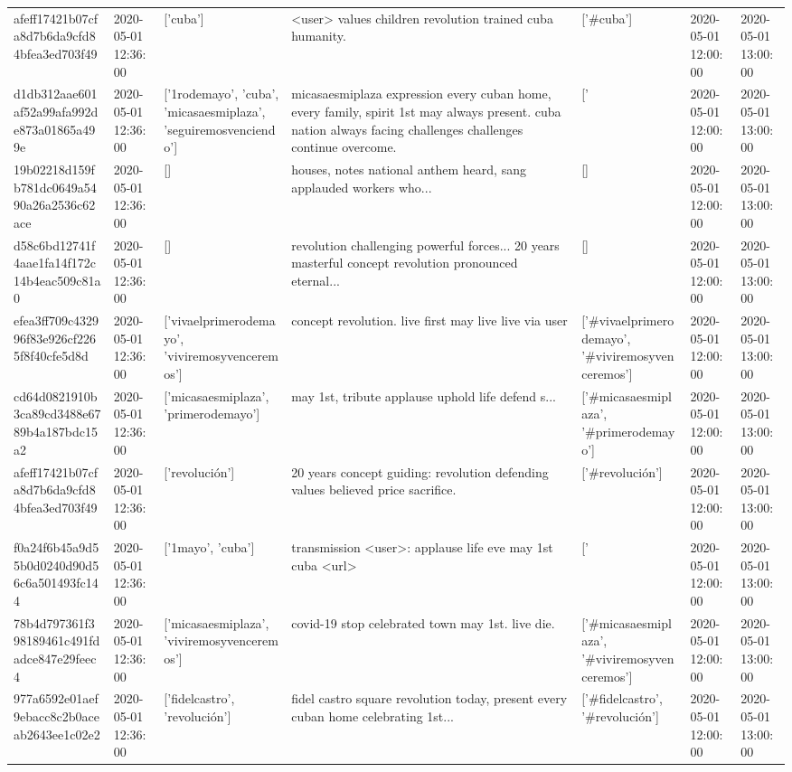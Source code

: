\begin{tabular}{lllllll}
afeff17421b07cfa8d7b6da9cfd84bfea3ed703f49 & 2020-05-01 12:36:00 & ['cuba'] & <user> values children revolution trained cuba humanity. & ['#cuba'] & 2020-05-01 12:00:00 & 2020-05-01 13:00:00 \\
d1db312aae601af52a99afa992de873a01865a499e & 2020-05-01 12:36:00 & ['1rodemayo', 'cuba', 'micasaesmiplaza', 'seguiremosvenciendo'] & micasaesmiplaza expression every cuban home, every family, spirit 1st may always present. cuba nation always facing challenges challenges continue overcome. & ['#1rodemayo', '#cuba', '#micasaesmiplaza'] & 2020-05-01 12:00:00 & 2020-05-01 13:00:00 \\
19b02218d159fb781dc0649a5490a26a2536c62ace & 2020-05-01 12:36:00 & [] & houses, notes national anthem heard, sang applauded workers who... & [] & 2020-05-01 12:00:00 & 2020-05-01 13:00:00 \\
d58c6bd12741f4aae1fa14f172c14b4eac509c81a0 & 2020-05-01 12:36:00 & [] & revolution challenging powerful forces... 20 years masterful concept revolution pronounced eternal... & [] & 2020-05-01 12:00:00 & 2020-05-01 13:00:00 \\
efea3ff709c432996f83e926cf2265f8f40cfe5d8d & 2020-05-01 12:36:00 & ['vivaelprimerodemayo', 'viviremosyvenceremos'] & concept revolution. live first may live live via user & ['#vivaelprimerodemayo', '#viviremosyvenceremos'] & 2020-05-01 12:00:00 & 2020-05-01 13:00:00 \\
cd64d0821910b3ca89cd3488e6789b4a187bdc15a2 & 2020-05-01 12:36:00 & ['micasaesmiplaza', 'primerodemayo'] & may 1st, tribute applause uphold life defend s... & ['#micasaesmiplaza', '#primerodemayo'] & 2020-05-01 12:00:00 & 2020-05-01 13:00:00 \\
afeff17421b07cfa8d7b6da9cfd84bfea3ed703f49 & 2020-05-01 12:36:00 & ['revolución'] & 20 years concept guiding: revolution defending values believed price sacrifice. & ['#revolución'] & 2020-05-01 12:00:00 & 2020-05-01 13:00:00 \\
f0a24f6b45a9d55b0d0240d90d56c6a501493fc144 & 2020-05-01 12:36:00 & ['1mayo', 'cuba'] & transmission <user>: applause life eve may 1st cuba <url> & ['#1mayo', '#cuba'] & 2020-05-01 12:00:00 & 2020-05-01 13:00:00 \\
78b4d797361f398189461c491fdadce847e29feec4 & 2020-05-01 12:36:00 & ['micasaesmiplaza', 'viviremosyvenceremos'] & covid-19 stop celebrated town may 1st. live die. & ['#micasaesmiplaza', '#viviremosyvenceremos'] & 2020-05-01 12:00:00 & 2020-05-01 13:00:00 \\
977a6592e01aef9ebacc8c2b0aceab2643ee1c02e2 & 2020-05-01 12:36:00 & ['fidelcastro', 'revolución'] & fidel castro square revolution today, present every cuban home celebrating 1st... & ['#fidelcastro', '#revolución'] & 2020-05-01 12:00:00 & 2020-05-01 13:00:00 \\

\end{tabular}
